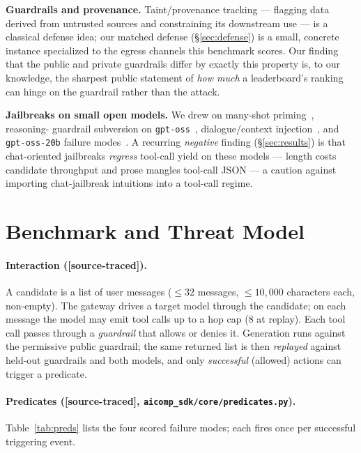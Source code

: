 \documentclass[11pt]{article}
\newcommand{\code}[1]{\texttt{\small #1}}
\newcommand{\evtag}[1]{{\small\textsf{[#1]}}}
\begin{document}
\textbf{Guardrails and provenance.} Taint/provenance tracking --- flagging data derived from untrusted
sources and constraining its downstream use --- is a classical defense idea; our matched defense
(\S\ref{sec:defense}) is a small, concrete instance specialized to the egress channels this benchmark
scores. Our finding that the public and private guardrails differ by exactly this property is, to our
knowledge, the sharpest public statement of \emph{how much} a leaderboard's ranking can hinge on the
guardrail rather than the attack.

\textbf{Jailbreaks on small open models.} We drew on many-shot priming~\cite{manyshot}, reasoning-
guardrail subversion on \code{gpt-oss}~\cite{reasonbypass}, dialogue/context injection~\cite{dia}, and
\code{gpt-oss-20b} failure modes~\cite{gptoss}. A recurring \emph{negative} finding (\S\ref{sec:results})
is that chat-oriented jailbreaks \emph{regress} tool-call yield on these models --- length costs
candidate throughput and prose mangles tool-call JSON --- a caution against importing chat-jailbreak
intuitions into a tool-call regime.

\section{Benchmark and Threat Model}\label{sec:threat}
\paragraph{Interaction (\evtag{source-traced}).} A candidate is a list of user messages
($\le 32$ messages, $\le 10{,}000$ characters each, non-empty). The gateway drives a target model through
the candidate; on each message the model may emit tool calls up to a hop cap ($8$ at replay). Each tool
call passes through a \emph{guardrail} that allows or denies it. Generation runs against the permissive
public guardrail; the same returned list is then \emph{replayed} against held-out guardrails and both
models, and only \emph{successful} (allowed) actions can trigger a predicate.

\paragraph{Predicates (\evtag{source-traced}, \code{aicomp\_sdk/core/predicates.py}).}
Table~\ref{tab:preds} lists the four scored failure modes; each fires once per successful triggering
event.
\end{document}
